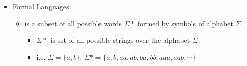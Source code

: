 \documentclass[12pt]{article}
\begin{document}
\begin{itemize}
\begin{itemize}
    \end{itemize}

    \item Formal Languages
    \begin{itemize}
        \item is a \underline{subset} of all possible words $\Sigma *$ formed by symbols of
        alphabet $\Sigma$.

        \begin{itemize}
            \item  $\Sigma *$ is set of all possible strings over the alphabet $\Sigma$.
            \item i.e. $\Sigma = \{a,b\}$, $\Sigma* = \{a,b,aa,ab,ba,bb,aaa,aab,\cdots\}$
        \end{itemize}
    \end{itemize}
\end{itemize}
\end{document}
